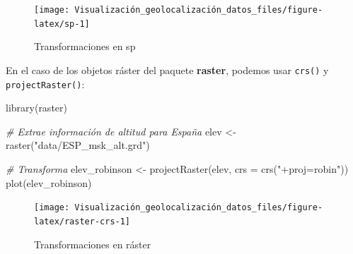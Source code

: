 \documentclass[
]{book}
\newenvironment{Shaded}{\begin{snugshade}}{\end{snugshade}}
\newcommand{\AttributeTok}[1]{\textcolor[rgb]{0.77,0.63,0.00}{#1}}
\newcommand{\CommentTok}[1]{\textcolor[rgb]{0.56,0.35,0.01}{\textit{#1}}}
\newcommand{\FunctionTok}[1]{\textcolor[rgb]{0.00,0.00,0.00}{#1}}
\newcommand{\NormalTok}[1]{#1}
\newcommand{\OtherTok}[1]{\textcolor[rgb]{0.56,0.35,0.01}{#1}}
\newcommand{\StringTok}[1]{\textcolor[rgb]{0.31,0.60,0.02}{#1}}
\theoremstyle{definition}
\theoremstyle{definition}
\theoremstyle{definition}
\theoremstyle{definition}
\theoremstyle{remark}
\begin{document}
\begin{Shaded}
\end{Shaded}

\begin{figure}

{\centering \texttt{[image: Visualización\_geolocalización\_datos\_files/figure-latex/sp-1]} 

}

\caption{Transformaciones en sp}\label{fig:sp}
\end{figure}

En el caso de los objetos ráster del paquete \textbf{raster}, podemos usar \texttt{crs()} y
\texttt{projectRaster()}:

\begin{Shaded}
\begin{Highlighting}[]
\FunctionTok{library}\NormalTok{(raster)}


\CommentTok{\# Extrae información de altitud para España}
\NormalTok{elev }\OtherTok{\textless{}{-}} \FunctionTok{raster}\NormalTok{(}\StringTok{"data/ESP\_msk\_alt.grd"}\NormalTok{)}


\CommentTok{\# Transforma}
\NormalTok{elev\_robinson }\OtherTok{\textless{}{-}} \FunctionTok{projectRaster}\NormalTok{(elev, }\AttributeTok{crs =} \FunctionTok{crs}\NormalTok{(}\StringTok{"+proj=robin"}\NormalTok{))}
\FunctionTok{plot}\NormalTok{(elev\_robinson)}
\end{Highlighting}
\end{Shaded}

\begin{figure}

{\centering \texttt{[image: Visualización\_geolocalización\_datos\_files/figure-latex/raster-crs-1]} 

}

\caption{Transformaciones en ráster}\label{fig:raster-crs}
\end{figure}
\end{document}
